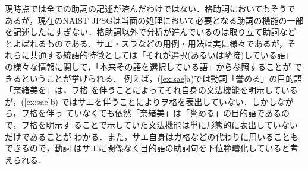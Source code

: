 現時点では全ての助詞の記述が済んだわけではない．格助詞においてもそうで
あるが，現在のNAIST JPSGは当面の処理において必要となる助詞の機能の一部
を記述したにすぎない．格助詞以外で分析が進んでいるのは取り立て助詞など
とよばれるものである．サエ・スラなどの用例・用法は実に様々であるが，そ
れらに共通する統語的特徴としては「それが選択(あるいは隣接)している語」
の様々な情報に関して，「本来その語を選択している語」から参照することが
できるということが挙げられる．
例えば，(\ref{ex:sae}a)では動詞「誉める」の目的語「奈緒美を」は，ヲ格
を伴うことによってそれ自身の文法機能を明示しているが，(\ref{ex:sae}b)
ではサエを伴うことによりヲ格を表出していない．しかしながら，ヲ格を伴っ
ていなくても依然「奈緒美」は「誉める」の目的語であるので，ヲ格を明示す
ることで示していた文法機能は単に形態的に表出していないだけであることが
わかる．また，サエ自身はガ格などの代わりに用いることもできるので，動詞
はサエに関係なく目的語の助詞句を下位範疇化していると考えられる．
